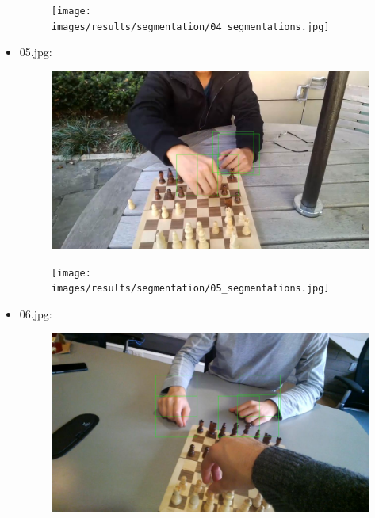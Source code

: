 \begin{itemize}
\begin{figure}[!htb]
\begin{minipage}{0.5\textwidth}
            \end{minipage}\hfill
            \begin{minipage}{0.5\textwidth}
                \centering
                \texttt{[image: images/results/segmentation/04\_segmentations.jpg]}
            \end{minipage}
        \end{figure}
    \item 05.jpg:
        \begin{figure}[!htb]
            \begin{minipage}{0.5\textwidth}
                \centering
                \includegraphics[scale = 0.205]{images/results/detection/05_detections.jpg}
            \end{minipage}\hfill
            \begin{minipage}{0.5\textwidth}
                \centering
                \texttt{[image: images/results/segmentation/05\_segmentations.jpg]}
            \end{minipage}
        \end{figure}
    \newpage
    \item 06.jpg:
        \begin{figure}[!htb]
            \begin{minipage}{0.5\textwidth}
                \centering
                \includegraphics[scale = 0.205]{images/results/detection/06_detections.jpg}

\end{minipage}
\end{figure}
\end{itemize}
